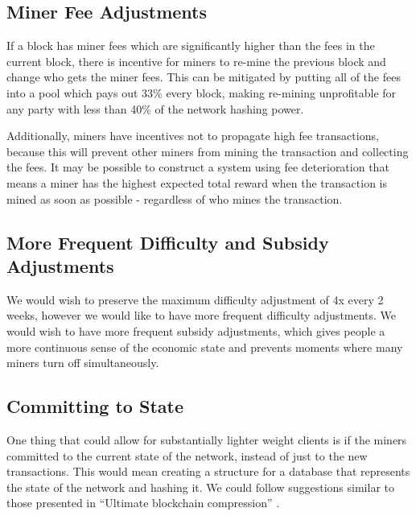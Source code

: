 \documentclass[twocolumn]{article}
\begin{document}
\subsection{Miner Fee Adjustments}
If a block has miner fees which are significantly higher than the fees in the current block, there is incentive for miners to re-mine the previous block and change who gets the miner fees.
This can be mitigated by putting all of the fees into a pool which pays out 33\% every block, making re-mining unprofitable for any party with less than 40\% of the network hashing power.

Additionally, miners have incentives not to propagate high fee transactions, because this will prevent other miners from mining the transaction and collecting the fees.
It may be possible to construct a system using fee deterioration that means a miner has the highest expected total reward when the transaction is mined as soon as possible - regardless of who mines the transaction.

\subsection{More Frequent Difficulty and Subsidy Adjustments}
We would wish to preserve the maximum difficulty adjustment of 4x every 2 weeks, however we would like to have more frequent difficulty adjustments.
We would wish to have more frequent subsidy adjustments, which gives people a more continuous sense of the economic state and prevents moments where many miners turn off simultaneously.

\subsection{Committing to State}
One thing that could allow for substantially lighter weight clients is if the miners committed to the current state of the network, instead of just to the new transactions.
This would mean creating a structure for a database that represents the state of the network and hashing it.
We could follow suggestions similar to those presented in ``Ultimate blockchain compression'' \cite{ubc}.

\end{document}
